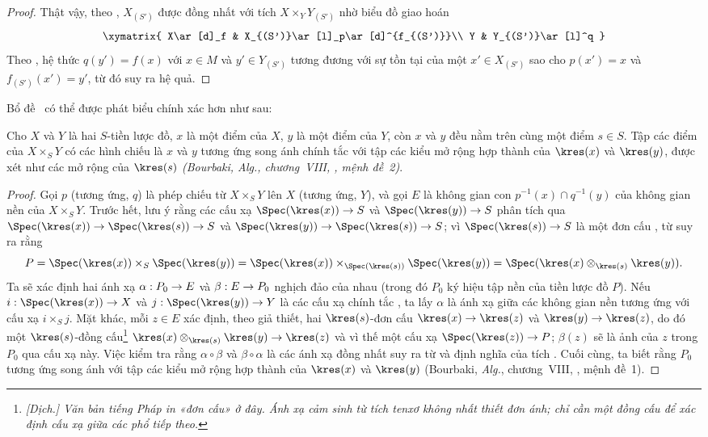 \documentclass[oneside]{amsart}
\makeatletter
\newcommand{\ega@arrow}[2]{\mathchoice{#1}{#2}{#2}{#2}}
\renewcommand{\to}{\ega@arrow{\longrightarrow}{\rightarrow}}
\newcommand{\oldpage}[2][]{{\marginnote{\normalfont\textbf{#1}~|~#2}}\ignorespaces}
\let\EGAOriginalLabel\label
\renewcommand{\label}[1]{\phantomsection\EGAOriginalLabel{#1}}
\makeatother
\begin{document}
\oldpage[I]{114}
\begin{proof}
Thật vậy, theo , $X_{(S')}$ được đồng nhất với tích
$X\times_Y Y_{(S')}$ nhờ biểu đồ giao hoán
\[
  \xymatrix{
    X\ar[d]_f &
    X_{(S')}\ar[l]_p\ar[d]^{f_{(S')}}\\
    Y &
    Y_{(S')}\ar[l]^q
  }
\]
Theo , hệ thức $q(y')=f(x)$ với $x\in M$ và
$y'\in Y_{(S')}$ tương đương với sự tồn tại của một $x'\in X_{(S')}$ sao
cho $p(x')=x$ và $f_{(S')}(x')=y'$, từ đó suy ra hệ quả.
\end{proof}

Bổ đề~ có thể được phát biểu chính xác hơn như sau:

\begin{proposition}[3.4.9]
\label{I.3.4.9}
Cho $X$ và $Y$ là hai $S$-tiền lược đồ, $x$ là một điểm của $X$, $y$ là một
điểm của $Y$, còn $x$ và $y$ đều nằm trên cùng một điểm $s\in S$.
Tập các điểm của $X\times_S Y$ có các hình chiếu là $x$ và $y$ tương ứng song
ánh chính tắc với tập các kiểu mở rộng hợp thành của $\kres(x)$ và $\kres(y)$,
được xét như các mở rộng của $\kres(s)$ \emph{(Bourbaki, \emph{Alg.},
chương~VIII, , mệnh đề~2)}.
\end{proposition}

\begin{proof}
Gọi $p$ (tương ứng, $q$) là phép chiếu từ $X\times_S Y$ lên $X$ (tương ứng,
$Y$), và gọi $E$ là không gian con $p^{-1}(x)\cap q^{-1}(y)$ của không gian
nền của $X\times_S Y$.
Trước hết, lưu ý rằng các cấu xạ $\Spec(\kres(x))\to S$ và
$\Spec(\kres(y))\to S$ phân tích qua
$\Spec(\kres(x))\to\Spec(\kres(s))\to S$ và
$\Spec(\kres(y))\to\Spec(\kres(s))\to S$; vì
$\Spec(\kres(s))\to S$ là một đơn cấu , từ
 suy ra rằng
\[
  P=\Spec(\kres(x))\times_S\Spec(\kres(y))=\Spec(\kres(x))\times_{\Spec(\kres(s))}\Spec(\kres(y))=\Spec(\kres(x)\otimes_{\kres(s)}\kres(y)).
\]
Ta sẽ xác định hai ánh xạ $\alpha:P_0\to E$ và $\beta:E\to P_0$ nghịch đảo
của nhau (trong đó $P_0$ ký hiệu tập nền của tiền lược đồ $P$).
Nếu $i:\Spec(\kres(x))\to X$ và $j:\Spec(\kres(y))\to Y$ là các cấu xạ chính
tắc , ta lấy $\alpha$ là ánh xạ giữa các không gian nền tương ứng
với cấu xạ $i\times_S j$.
Mặt khác, mỗi $z\in E$ xác định, theo giả thiết, hai $\kres(s)$-đơn cấu
$\kres(x)\to\kres(z)$ và $\kres(y)\to\kres(z)$, do đó một
$\kres(s)$-đồng cấu\footnote{\emph{[Dịch.] Văn bản tiếng Pháp in «đơn cấu» ở
đây. Ánh xạ cảm sinh từ tích tenxơ không nhất thiết đơn ánh; chỉ cần một đồng
cấu để xác định cấu xạ giữa các phổ tiếp theo.}}
$\kres(x)\otimes_{\kres(s)}\kres(y)\to\kres(z)$ và vì thế một cấu xạ
$\Spec(\kres(z))\to P$; $\beta(z)$ sẽ là ảnh của $z$ trong $P_0$ qua cấu xạ
này.
Việc kiểm tra rằng $\alpha\circ\beta$ và $\beta\circ\alpha$ là các ánh xạ đồng
nhất suy ra từ  và định nghĩa của tích .
Cuối cùng, ta biết rằng $P_0$ tương ứng song ánh với tập các kiểu mở rộng hợp
thành của $\kres(x)$ và $\kres(y)$ (Bourbaki, \emph{Alg.}, chương~VIII,
, mệnh đề~1).
\end{proof}
\end{document}
